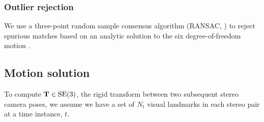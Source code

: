 \subsubsection{Outlier rejection}

We use a three-point random sample consensus algorithm (RANSAC, \cite{FischlerRANSAC:1981}) to reject spurious matches based on an analytic solution to the six degree-of-freedom motion \citep{Umeyama1991-ws}.
  
\subsection{Motion solution}

To compute
$\boldsymbol{\mathbf{T}}\in\text{SE}(3)$, the rigid transform between two subsequent stereo camera poses, we assume we have a set
of $N_t$ visual landmarks in each stereo pair at a time instance, $t$.

